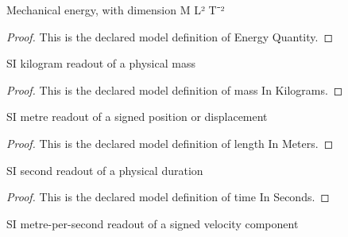 \begin{definition}
  \label{def:physics:phyx-mini-0280:phyxminiproblems-problemphyxmini0280-energyquantity}
  Mechanical energy, with dimension M L² T⁻²
\end{definition}
\begin{proof}
  This is the declared model definition of Energy Quantity.
\end{proof}
\begin{definition}
  \label{def:physics:phyx-mini-0280:phyxminiproblems-problemphyxmini0280-massinkilograms}
  SI kilogram readout of a physical mass
\end{definition}
\begin{proof}
  This is the declared model definition of mass In Kilograms.
\end{proof}
\begin{definition}
  \label{def:physics:phyx-mini-0280:phyxminiproblems-problemphyxmini0280-lengthinmeters}
  SI metre readout of a signed position or displacement
\end{definition}
\begin{proof}
  This is the declared model definition of length In Meters.
\end{proof}
\begin{definition}
  \label{def:physics:phyx-mini-0280:phyxminiproblems-problemphyxmini0280-timeinseconds}
  SI second readout of a physical duration
\end{definition}
\begin{proof}
  This is the declared model definition of time In Seconds.
\end{proof}
\begin{definition}
  \label{def:physics:phyx-mini-0280:phyxminiproblems-problemphyxmini0280-velocityinmeterspersecond}
  SI metre-per-second readout of a signed velocity component
\end{definition}

